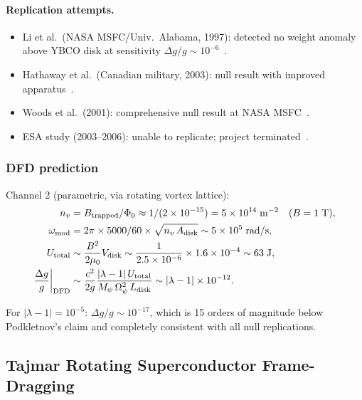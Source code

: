\documentclass[aps,prd,twocolumn,superscriptaddress,floatfix,nofootinbib]{revtex4-2}
\newcommand{\Opsi}{\Omega_\psi}
\newcommand{\Mpsi}{M_\psi}
\newcommand{\lam}{\lambda}
\begin{document}
\paragraph{Replication attempts.}
\begin{itemize}[nosep]
\item Li et al.\ (NASA MSFC/Univ.\ Alabama, 1997): detected no weight
anomaly above YBCO disk at sensitivity $\Delta g/g \sim
10^{-6}$~\cite{Li1997}.
\item Hathaway et al.\ (Canadian military, 2003): null result with
improved apparatus~\cite{Hathaway2003}.
\item Woods et al.\ (2001): comprehensive null result at NASA
MSFC~\cite{Woods2001}.
\item ESA study (2003--2006): unable to replicate; project
terminated~\cite{ESA2006}.
\end{itemize}

\subsubsection{DFD prediction}

Channel 2 (parametric, via rotating vortex lattice):
\begin{align}
n_v &= B_{\rm trapped}/\Phi_0
\approx 1/(2\times10^{-15}) = 5\times10^{14}\;\si{m^{-2}}
\quad(B = 1\;\si{T}), \\
\omega_{\rm mod} &= 2\pi \times 5000/60 \times \sqrt{n_v\,A_{\rm disk}}
\sim 5\times10^5\;\si{rad/s}, \\
U_{\rm total} &\sim \frac{B^2}{2\mu_0}V_{\rm disk}
\sim \frac{1}{2.5\times10^{-6}} \times 1.6\times10^{-4}
\sim 63\;\si{J}, \\
\frac{\Delta g}{g}\bigg|_{\rm DFD} &\sim
\frac{c^2}{2g}\frac{|\lam-1|\,U_{\rm total}}
{\Mpsi\,\Opsi^2\,L_{\rm disk}}
\sim |\lam-1| \times 10^{-12}.
\end{align}

For $|\lam-1| = 10^{-5}$: $\Delta g/g \sim 10^{-17}$, which is
15 orders of magnitude below Podkletnov's claim and completely
consistent with all null replications.

\subsection{Tajmar Rotating Superconductor Frame-Dragging}\label{sec:tajmar-fd}
\end{document}
